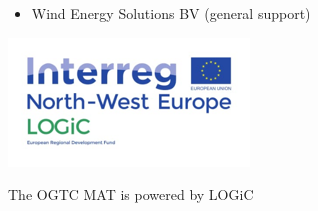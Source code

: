 \documentclass{article}[11pt]
\begin{document}
\begin{multicols}{2}
\begin{itemize}
\item Wind Energy Solutions BV (general support)

\end{itemize}

\vfill

\begin{center}

\includegraphics[width=\linewidth]{logiclogo.png}

\end{center}

\centering \small{The OGTC MAT is powered by LOGiC}

\end{multicols}
\end{document}
